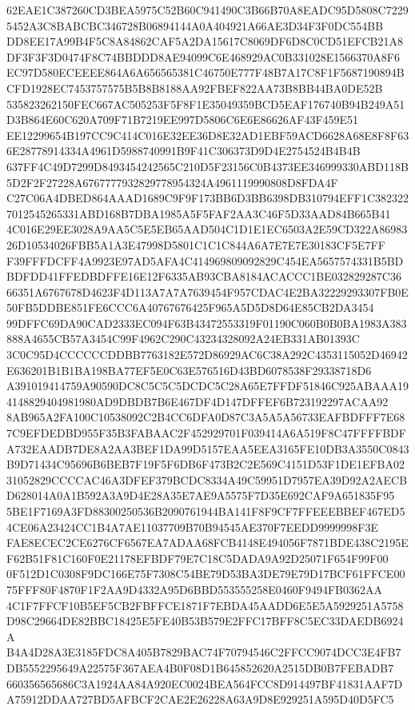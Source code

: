 \documentclass[UTF8,fontset=fandol,zihao=-4,a4paper]{ctexart}
\begin{document}
{{62EAE1C387260CD3BEA5975C52B60C941490C3B66B70A8EADC95D5808C72295452A3C8BABCBC346728B06894144A0A404921A66AE3D34F3F0DC554BB
DD8EE17A99B4F5C8A84862CAF5A2DA15617C8069DF6D8C0CD51EFCB21A8DF3F3F3D0474F8C74BBDDD8AE94099C6E468929AC0B331028E1566370A8F6
EC97D580ECEEEE864A6A656565381C46750E777F48B7A17C8F1F5687190894BCFD1928EC7453757575B5B8B8188AA92FBEF822AA73B8BB44BA0DE52B
535823262150FEC667AC505253F5F8F1E35049359BCD5EAF176740B94B249A51D3B864E60C620A709F71B7219EE997D5806C6E6E86626AF43F459E51
EE12299654B197CC9C414C016E32EE36D8E32AD1EBF59ACD6628A68E8F8F636E28778914334A4961D5988740991B9F41C306373D9D4E2754524B4B4B
637FF4C49D7299D8493454242565C210D5F23156C0B4373EE346999330ABD118B5D2F2F27228A6767777932829778954324A4961119990808D8FDA4F
C27C06A4DBED864AAAD1689C9F9F173BB6D3BB6398DB310794EFF1C3823227012545265331ABD168B7DBA1985A5F5FAF2AA3C46F5D33AAD84B665B41
4C016E29EE3028A9AA5C5E5EB65AAD504C1D1E1EC6503A2E59CD322A8698326D10534026FBB5A1A3E47998D5801C1C1C844A6A7E7E7E30183CF5E7FF
F39FFFDCFF4A9923E97AD5AFA4C414969809092829C454EA5657574331B5BDBDFDD41FFEDBDFFE16E12F6335AB93CBA8184ACACCC1BE032829287C36
66351A6767678D4623F4D113A7A7A7639454F957CDAC4E2BA32229293307FB0E50FB5DDBE851FE6CCC6A40767676425F965A5D5D8D64E85CB2DA3454
99DFFC69DA90CAD2333EC094F63B43472553319F01190C060B0B0BA1983A383888A4655CB57A3454C99F4962C290C43234328092A24EB331AB01393C
3C0C95D4CCCCCCDDBB7763182E572D86929AC6C38A292C4353115052D46942E636201B1B1BA198BA77EF5E0C63E576516D43BD6078538F29338718D6
A391019414759A90590DC8C5C5C5DCDC5C28A65E7FFDF51846C925ABAAA194148829404981980AD9DBDB7B6E467DF4D147DFFEF6B723192297ACAA92
8AB965A2FA100C10538092C2B4CC6DFA0D87C3A5A5A56733EAFBDFFF7E687C9EFDEDBD955F35B3FABAAC2F452929701F039414A6A519F8C47FFFFBDF
A732EAADB7DE8A2AA3BEF1DA99D5157EAA5EEA3165FE10DB3A3550C0843B9D71434C95696B6BEB7F19F5F6DB6F473B2C2E569C4151D53F1DE1EFBA02
31052829CCCCAC46A3DFEF379BCDC8334A49C59951D7957EA39D92A2AECBD628014A0A1B592A3A9D4E28A35E7AE9A5575F7D35E692CAF9A651835F95
5BE1F7169A3FD88300250536B2090761944BA141F8F9CF7FFEEEBBEF467ED54CE06A23424CC1B4A7AE11037709B70B94545AE370F7EEDD9999998F3E
FAE8ECEC2CE6276CF6567EA7ADAA68FCB4148E494056F7871BDE438C2195EF62B51F81C160F0E21178EFBDF79E7C18C5DADA9A92D25071F654F99F00
0F512D1C0308F9DC166E75F7308C54BE79D53BA3DE79E79D17BCF61FFCE0075FFF80F4870F1F2AA9D4332A95D6BBD553555258E0460F9494FB0362AA
4C1F7FFCF10B5EF5CB2FBFFCE1871F7EBDA45AADD6E5E5A5929251A5758D98C29664DE82BBC18425E5FE40B53B579E2FFC17BFF8C5EC33DAEDB6924A
B4A4D28A3E3185FDC8A405B7829BAC74F70794546C2FFCC9074DCC3E4FB7DB5552295649A22575F367AEA4B0F08D1B645852620A2515DB0B7FEBADB7
660356565686C3A1924AA84A920EC0024BEA564FCC8D914497BF41831AAF7DA75912DDAA727BD5AFBCF2CAE2E26228A63A9D8E929251A595D40D5FC5
}}
\end{document}
